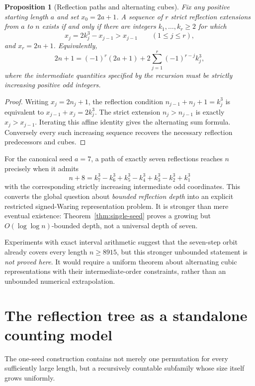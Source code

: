 \documentclass[10pt]{article}
\newtheorem{proposition}{Proposition}
\begin{document}
\begin{proposition}[Reflection paths and alternating cubes]
\label{prop:signed-waring}
Fix any positive starting length $a$ and
set $x_0=2a+1$.
A sequence of $r$ strict reflection
extensions from $a$ to $n$ exists if
and only if there are integers
$k_1,\ldots,k_r\ge2$ for which
\[
x_j=2k_j^3-x_{j-1}>x_{j-1}
\qquad(1\le j\le r),
\]
and $x_r=2n+1$.
Equivalently,
\[
\boxed{\displaystyle
2n+1=(-1)^r(2a+1)
+2\sum_{j=1}^{r}(-1)^{r-j}k_j^3,}
\]
where the intermediate quantities
specified by the recursion must be
strictly increasing positive odd integers.
\end{proposition}
\begin{proof}
Writing $x_j=2n_j+1$,
the reflection condition
$n_{j-1}+n_j+1=k_j^3$
is equivalent to
$x_{j-1}+x_j=2k_j^3$.
The strict extension $n_j>n_{j-1}$
is exactly $x_j>x_{j-1}$.
Iterating this affine identity
gives the alternating sum formula.
Conversely every such increasing
sequence recovers the necessary
reflection predecessors and cubes.
\end{proof}

For the canonical seed $a=7$, a path
of exactly seven reflections reaches
$n$ precisely when it admits
\[
\boxed{\displaystyle
n+8=
k_7^3-k_6^3+k_5^3-k_4^3+
k_3^3-k_2^3+k_1^3}
\]
with the corresponding strictly
increasing intermediate odd coordinates.
This converts the global question
about \emph{bounded reflection depth}
into an explicit restricted
signed-Waring representation problem.
It is stronger than mere eventual
existence: Theorem~\ref{thm:single-seed}
proves a growing but
$O(\log\log n)$-bounded depth,
not a universal depth of seven.

Experiments with exact interval arithmetic
suggest that the seven-step orbit already
covers every length $n\ge8915$,
but this stronger unbounded statement
is \emph{not proved here}. It would
require a uniform theorem about
alternating cubic representations
with their intermediate-order
constraints, rather than an
unbounded numerical extrapolation.

\section{The reflection tree as a standalone counting model}
\label{sec:reflection-tree}

The one-seed construction contains not merely one
permutation for every sufficiently large length,
but a recursively countable subfamily
whose size itself grows uniformly.
\end{document}
